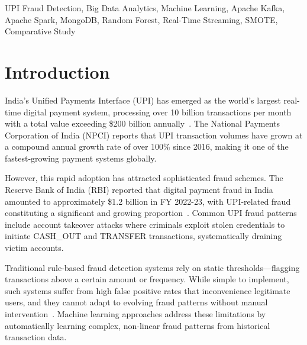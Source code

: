 \documentclass[conference]{IEEEtran}
\begin{document}
\begin{IEEEkeywords}
UPI Fraud Detection, Big Data Analytics, Machine Learning, Apache Kafka, Apache Spark, MongoDB, Random Forest, Real-Time Streaming, SMOTE, Comparative Study
\end{IEEEkeywords}

\section{Introduction}
India's Unified Payments Interface (UPI) has emerged as the world's largest real-time digital payment system, processing over 10 billion transactions per month with a total value exceeding \$200 billion annually~\cite{npci2023}. The National Payments Corporation of India (NPCI) reports that UPI transaction volumes have grown at a compound annual growth rate of over 100\% since 2016, making it one of the fastest-growing payment systems globally.

However, this rapid adoption has attracted sophisticated fraud schemes. The Reserve Bank of India (RBI) reported that digital payment fraud in India amounted to approximately \$1.2 billion in FY 2022-23, with UPI-related fraud constituting a significant and growing proportion~\cite{rbi2023}. Common UPI fraud patterns include account takeover attacks where criminals exploit stolen credentials to initiate CASH\_OUT and TRANSFER transactions, systematically draining victim accounts.

Traditional rule-based fraud detection systems rely on static thresholds---flagging transactions above a certain amount or frequency. While simple to implement, such systems suffer from high false positive rates that inconvenience legitimate users, and they cannot adapt to evolving fraud patterns without manual intervention~\cite{bhattacharyya2011}. Machine learning approaches address these limitations by automatically learning complex, non-linear fraud patterns from historical transaction data.
\end{document}
